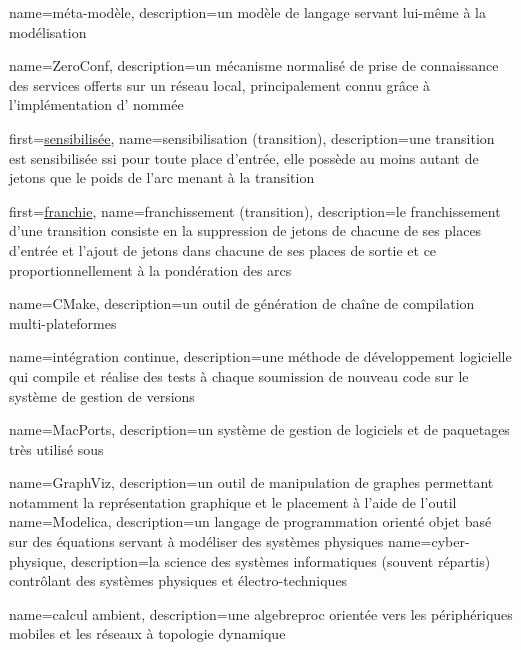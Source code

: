 {
	name={méta-modèle},
	description={un modèle de langage servant lui-même à la modélisation}	
}

{
	name={ZeroConf},
	description={un mécanisme normalisé de prise de connaissance des services offerts sur un réseau local, principalement connu grâce à l'implémentation d' nommée }	
}

{
	first={\underline{sensibilisée}},
	name={sensibilisation (transition)},
	description={une transition est sensibilisée ssi pour toute place d'entrée, elle possède au moins autant de jetons que le poids de l'arc menant à la transition~\cite[p. 35]{allombert2009aspects}}	
}

{
	first={\underline{franchie}},
	name={franchissement (transition)},
	description={le franchissement d'une transition consiste en la suppression de jetons de chacune de ses places d'entrée et l'ajout de jetons dans chacune de ses places de sortie et ce proportionnellement à la pondération des arcs}	
}

{
	name={CMake}, 
	description={un outil de génération de chaîne de compilation multi-plateformes}
}

{
	name={intégration continue},
	description={une méthode de développement logicielle qui compile et réalise des tests à chaque soumission de nouveau code sur le système de gestion de versions}
}

{
	name=MacPorts, 
	description={un système de gestion de logiciels et de paquetages très utilisé sous }
}

{
	name=GraphViz, 
	description={un outil de manipulation de graphes permettant notamment la représentation graphique et le placement à l'aide de l'outil }
}
{
	name=Modelica, 
	description={un langage de programmation orienté objet basé sur des équations servant à modéliser des systèmes physiques}
}
{
	name=cyber-physique, 
	description={la science des systèmes informatiques (souvent répartis) contrôlant des systèmes physiques et électro-techniques}
}

{
	name={calcul ambient}, 
	description={une \gls{algebreproc} orientée vers les périphériques mobiles et les réseaux à topologie dynamique}
}

